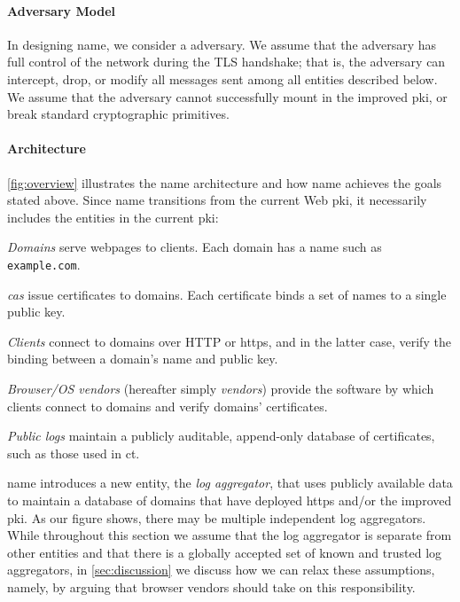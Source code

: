 \paragraph{Adversary Model}
In designing \ac{name}, we consider a  adversary. 
We assume that the adversary has full
control of the network during the TLS handshake; that is, the adversary can
intercept, drop, or modify all messages sent among all entities described
below. We assume that the adversary cannot successfully mount  in the improved
\ac{pki}, or break standard cryptographic primitives.

\paragraph{Architecture}
\autoref{fig:overview} illustrates the \ac{name} architecture and how \ac{name}
achieves the goals stated above. Since \ac{name} transitions from the current
Web \ac{pki}, it necessarily includes the entities in the current \ac{pki}:
\begin{compactitem}
\item \emph{Domains} serve webpages to clients. Each domain has a name such as
  \texttt{example.com}.
\item \emph{\acp{ca}} issue certificates to domains. Each certificate binds a
  set of names to a single public key.
\item \emph{Clients} connect to domains over HTTP or \ac{https}, and in the
  latter case, verify the binding between a domain's name and public key.
\item \emph{Browser/OS vendors} (hereafter simply \emph{vendors}) provide the
  software by which clients connect to domains and verify domains' certificates.
\item \emph{Public logs} maintain a publicly auditable, append-only database of
  certificates, such as those used in \ac{ct}.
\end{compactitem}
\ac{name} introduces a new entity, the \emph{log aggregator}, that uses publicly
available data to maintain a database of domains that have deployed \ac{https}
and/or the improved \ac{pki}. As our figure shows, there may be multiple
independent log aggregators. While throughout this section we assume that the
log aggregator is separate from other entities and that there is a globally
accepted set of known and trusted log aggregators, in \autoref{sec:discussion}
we discuss how we can relax these assumptions, namely, by arguing that browser
vendors should take on this responsibility.

